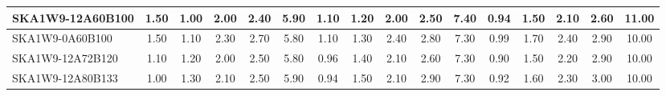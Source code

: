 \begin{table}[H]
{{\begin{tabular}{|lccccc||ccccc||ccccc|}
SKA1W9-12A60B100 & 1.50 \cellcolor{blue!44.25} & 1.00 \cellcolor{red!19.35} & 2.00 \cellcolor{green!28.50} & 2.40 \cellcolor{orange!18.00} & 5.90 \cellcolor{purple!60.00} & 1.10 \cellcolor{blue!32.61} & 1.20 \cellcolor{red!26.40} & 2.00 \cellcolor{green!18.00} & 2.50 \cellcolor{orange!18.00} & 7.40 \cellcolor{purple!60.00} & 0.94 \cellcolor{blue!21.36} & 1.50 \cellcolor{red!18.00} & 2.10 \cellcolor{green!18.00} & 2.60 \cellcolor{orange!32.00} & 11.00 \cellcolor{purple!60.00}\\ \hline 
SKA1W9-0A60B100 & 1.50 \cellcolor{blue!44.25} & 1.10 \cellcolor{red!26.13} & 2.30 \cellcolor{green!60.00} & 2.70 \cellcolor{orange!60.00} & 5.80 \cellcolor{purple!49.50} & 1.10 \cellcolor{blue!32.61} & 1.30 \cellcolor{red!34.80} & 2.40 \cellcolor{green!60.00} & 2.80 \cellcolor{orange!49.50} & 7.30 \cellcolor{purple!49.50} & 0.99 \cellcolor{blue!25.56} & 1.70 \cellcolor{red!60.00} & 2.40 \cellcolor{green!60.00} & 2.90 \cellcolor{orange!53.00} & 10.00 \cellcolor{purple!18.00}\\ \hline 
SKA1W9-12A72B120 & 1.10 \cellcolor{blue!23.25} & 1.20 \cellcolor{red!32.90} & 2.00 \cellcolor{green!28.50} & 2.50 \cellcolor{orange!32.00} & 5.80 \cellcolor{purple!49.50} & 0.96 \cellcolor{blue!19.83} & 1.40 \cellcolor{red!43.20} & 2.10 \cellcolor{green!28.50} & 2.60 \cellcolor{orange!28.50} & 7.30 \cellcolor{purple!49.50} & 0.90 \cellcolor{blue!18.00} & 1.50 \cellcolor{red!18.00} & 2.20 \cellcolor{green!32.00} & 2.90 \cellcolor{orange!53.00} & 10.00 \cellcolor{purple!18.00}\\ \hline 
SKA1W9-12A80B133 & 1.00 \cellcolor{blue!18.00} & 1.30 \cellcolor{red!39.68} & 2.10 \cellcolor{green!39.00} & 2.50 \cellcolor{orange!32.00} & 5.90 \cellcolor{purple!60.00} & 0.94 \cellcolor{blue!18.00} & 1.50 \cellcolor{red!51.60} & 2.10 \cellcolor{green!28.50} & 2.90 \cellcolor{orange!60.00} & 7.30 \cellcolor{purple!49.50} & 0.92 \cellcolor{blue!19.68} & 1.60 \cellcolor{red!39.00} & 2.30 \cellcolor{green!46.00} & 3.00 \cellcolor{orange!60.00} & 10.00 \cellcolor{purple!18.00}\\ \hline 
\end{tabular}}
\vspace{-0.300000cm}
\hspace{1cm} 
}
\end{table}
